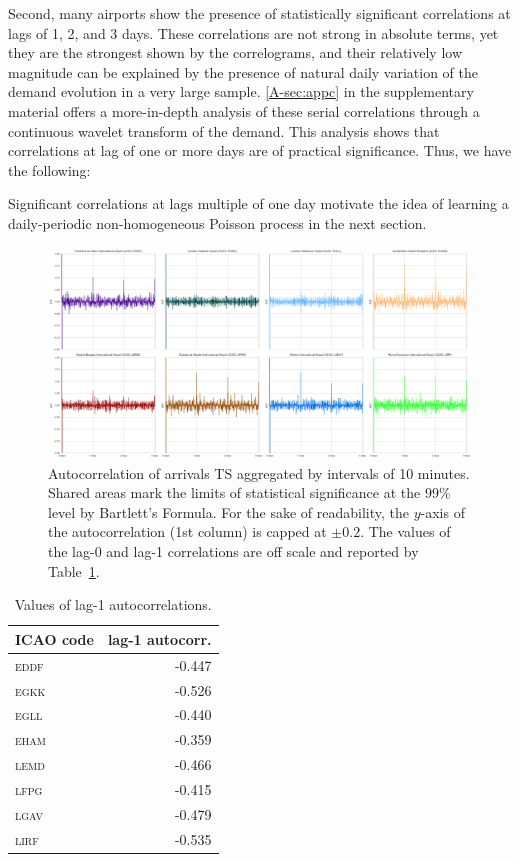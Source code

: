 \documentclass[draft,review]{elsarticle}
\newcommand{\airp}[1]{\textcolor{#1}{\textsc{#1}}}
\begin{document}
Second, many airports show the presence of statistically significant correlations at lags of 1, 2, and 3 days.
These correlations are not strong in absolute terms, yet they are the strongest shown by the correlograms, and their relatively low magnitude can be explained by the presence of natural daily variation of the demand evolution in a very large sample.
\ref{A-sec:appc} in the supplementary material offers a more-in-depth analysis of these serial correlations through a continuous wavelet transform of the demand. This analysis shows that correlations at lag of one or more days are of practical significance. Thus, we have the following:
\begin{kpt}\label{rmk:correlations}
  Significant correlations at lags multiple of one day motivate the idea of learning a daily-periodic non-homogeneous Poisson process in the next section.
\end{kpt}

\begin{figure}
  \includegraphics[width=\textwidth]{Autocorr}
  \caption{Autocorrelation of arrivals \ac{TS} aggregated by intervals of 10 minutes. Shared areas mark the limits of statistical significance at the 99\% level by Bartlett's Formula. For the sake of readability, the \(y\)-axis of the autocorrelation (1st column) is capped at \(\pm 0.2\). The values of the lag-0 and lag-1 correlations are off scale and reported by Table~\ref{tab:lag01}.}\label{fig:autocorr}
\end{figure}

\begin{table}[tbp]
  \centering
  \caption{Values of lag-1 autocorrelations.}\label{tab:lag01}
  \begin{tabular}{lr}
    \toprule
    \acs{ICAO} code & lag-1 autocorr.\\
    \midrule
    \airp{eddf} & -0.447\\
    \airp{egkk} & -0.526\\
    \airp{egll} & -0.440\\
    \airp{eham} & -0.359\\
    \airp{lemd} & -0.466\\
    \airp{lfpg} & -0.415\\
    \airp{lgav} & -0.479\\
    \airp{lirf} & -0.535\\
    \bottomrule
  \end{tabular}
\end{table}
\end{document}
